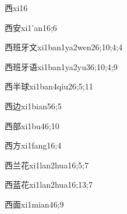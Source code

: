 
\begin{verbete}{西}{xi1}{6}
\end{verbete}

\begin{verbete}{西安}{xi1'an1}{6;6}
\end{verbete}

\begin{verbete}{西班牙文}{xi1ban1ya2wen2}{6;10;4;4}
\end{verbete}

\begin{verbete}{西班牙语}{xi1ban1ya2yu3}{6;10;4;9}
\end{verbete}

\begin{verbete}{西半球}{xi1ban4qiu2}{6;5;11}
\end{verbete}

\begin{verbete}{西边}{xi1bian5}{6;5}
\end{verbete}

\begin{verbete}{西部}{xi1bu4}{6;10}
\end{verbete}

\begin{verbete}{西方}{xi1fang1}{6;4}
\end{verbete}

\begin{verbete}{西兰花}{xi1lan2hua1}{6;5;7}
\end{verbete}

\begin{verbete}{西蓝花}{xi1lan2hua1}{6;13;7}
\end{verbete}

\begin{verbete}{西面}{xi1mian4}{6;9}
\end{verbete}

